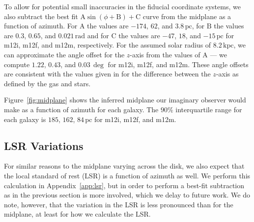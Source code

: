 \documentclass[twocolumn]{aastex62}
\newcommand{\Gus}[1]{\textcolor{red}{#1}}
\newcommand{\pc}{\text{pc}}
\newcommand{\kpc}{\text{kpc}}
\newcommand{\uth}{\textsuperscript{th}}
\begin{document}
To allow for potential small inaccuracies in the fiducial coordinate systems,
we also subtract the best fit $\text{A} \sin{\left(\phi + \text{B}\right)} +
\text{C}$ curve from the midplane as a function of azimuth. For $\text{A}$ the
values are $-174$, $62$, and $3.8\,\pc$, for $\text{B}$ the values are $0.3$,
$0.65$, and $0.021\,\text{rad}$ and for $\text{C}$ the values are $-47$, $18$,
and $-15\,\pc$ for m12i, m12f, and m12m, respectively. For the assumed solar
radius of $8.2\,\kpc$, we can approximate the angle offset for the $z$-axis
from the values of $\text{A}$ --- we compute $1.22$, $0.43$, and $0.03\,\deg$
for m12i, m12f, and m12m. These angle offsets are consistent with the values
given in \citet{2018arXiv180610564S} for the difference between the $z$-axis
as defined by the gas and stars.

Figure~\ref{fig:midplane} shows the inferred midplane our imaginary observer
would make as a function of azimuth for each galaxy. The $90\%$ interquartile
range for each galaxy is $185$, $162$, $84\,\pc$ for m12i, m12f, and m12m. 

\begin{figure*}
\caption{The local midplane determined at the fiducial Solar radius
($8.2\,\kpc$) for the three FIRE galaxies m12i, m21f, and m12m ({\em left},
{\em center}, and {\em right} panels). The local midplane is determined at a
position $\phi$ by taking the median height of all stars within $R=0.5\,\kpc$
and $z=1\,\kpc$ (in cylindrical coordinates). The procedure is performed again
using the new height $10$ times to converge on the local midplane height. In
order to allow for the possibility that the fiducial Galactocentric coordinate
system is incorrect, we subtract the best fit $A\sin{(\phi+B)}+C$ curve from
each panel --- this figure is reproduced with the original midplane
determination (i.e. before subtracting the best fit sine curve) in
Appendix~\Gus{x}. We then bootstrap resample $1000$ times on all stars within
a $2\,\kpc$ height of the fiducial midplane to determine error bars (95\uth
and 5\uth percentiles), which we report as dashed lines.}
\label{fig:midplane}
\end{figure*}

\subsection{LSR Variations} \label{ssec:lsr_var}
For similar reasons to the midplane varying across the disk, we also expect
that the local standard of rest (LSR) is a function of azimuth as well. We
perform this calculation in Appendix~\ref{app:lsr}, but in order to perform a
best-fit subtraction as in the previous section is more involved, which we
delay to future work. We do note, however, that the variation in the LSR is
less pronounced than for the midplane, at least for how we calculate the LSR.
\end{document}
